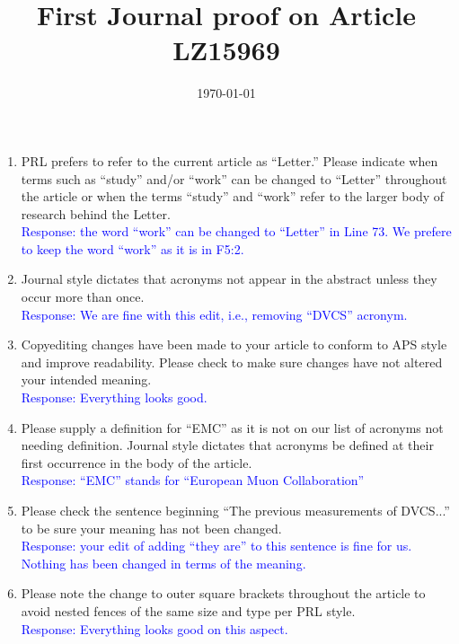 \documentclass[a4paper,11pt,twoside]{article}
\title{First Journal proof on Article LZ15969}
\date{\today}
\begin{document}
\maketitle


\begin{enumerate}
   \item  PRL prefers to refer to the current article as ``Letter.'' Please 
      indicate when terms such as ``study'' and/or ``work'' can be changed to 
      ``Letter'' throughout the article or when the terms ``study'' and 
      ``work'' refer to the larger body of research behind the Letter.\\
      \textcolor{blue}{Response: the word ``work'' can be changed to ``Letter'' 
      in Line 73. We prefere to keep the word ``work'' as it is in F5:2. }
      
   \item Journal style dictates that acronyms not appear in the abstract unless 
      they occur more than once.\\
      \textcolor{blue}{Response: We are fine with this edit, i.e., removing 
      ``DVCS'' acronym. }

     
\item Copyediting changes have been made to your article to conform to APS 
   style and improve readability. Please check to make sure changes have not 
      altered your intended meaning.\\
      \textcolor{blue}{Response: Everything looks good. }

\item Please supply a definition for ``EMC'' as it is not on our list of 
   acronyms not needing definition. Journal style dictates that acronyms be 
      defined at their first occurrence in the body of the article.\\
      \textcolor{blue}{Response: ``EMC'' stands for ``European Muon 
      Collaboration'' }
      
   \item Please check the sentence beginning ``The previous measurements of 
      DVCS...'' to be sure your meaning has not been changed.\\
      \textcolor{blue}{Response: your edit of adding ``they are'' to this 
      sentence is fine for us. Nothing has been changed in terms of the 
      meaning. }

\item Please note the change to outer square brackets throughout the article to 
   avoid nested fences of the same size and type per PRL style.\\
      \textcolor{blue}{Response: Everything looks good on this aspect. }


\end{enumerate}
\end{document}
